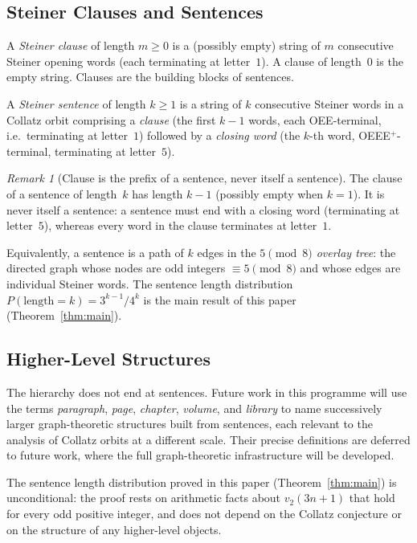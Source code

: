 \documentclass[12pt]{article}
\theoremstyle{definition}
\theoremstyle{remark}
\newtheorem{remark}[theorem]{Remark}
\begin{document}
\subsection*{Steiner Clauses and Sentences}

A \emph{Steiner clause} of length $m \geq 0$ is a (possibly empty) string of
$m$ consecutive Steiner opening words (each terminating at letter~$1$).
A clause of length~$0$ is the empty string.
Clauses are the building blocks of sentences.

A \emph{Steiner sentence} of length $k \geq 1$ is a string of $k$ consecutive
Steiner words in a Collatz orbit comprising a \emph{clause} (the first $k-1$
words, each OEE-terminal, i.e.\ terminating at letter~$1$) followed by a
\emph{closing word} (the $k$-th word, OEEE$^+$-terminal, terminating at
letter~$5$).

\begin{remark}[Clause is the prefix of a sentence, never itself a sentence]
The clause of a sentence of length~$k$ has length $k-1$ (possibly empty when
$k=1$).
It is never itself a sentence: a sentence must end with a closing word
(terminating at letter~$5$), whereas every word in the clause terminates at
letter~$1$.
\end{remark}

Equivalently, a sentence is a path of $k$ edges in the \emph{$5 \pmod{8}$
overlay tree}: the directed graph whose nodes are odd integers $\equiv 5
\pmod{8}$ and whose edges are individual Steiner words.
The sentence length distribution $P(\text{length} = k) = 3^{k-1}/4^k$ is the
main result of this paper (Theorem~\ref{thm:main}).

\subsection*{Higher-Level Structures}

The hierarchy does not end at sentences.
Future work in this programme will use the terms \emph{paragraph}, \emph{page},
\emph{chapter}, \emph{volume}, and \emph{library} to name successively larger
graph-theoretic structures built from sentences, each relevant to the analysis
of Collatz orbits at a different scale.
Their precise definitions are deferred to future work,
where the full graph-theoretic infrastructure will be developed.

The sentence length distribution proved in this paper (Theorem~\ref{thm:main})
is unconditional: the proof rests on arithmetic facts about $v_2(3n+1)$ that
hold for every odd positive integer, and does not depend on the Collatz
conjecture or on the structure of any higher-level objects.
\end{document}
